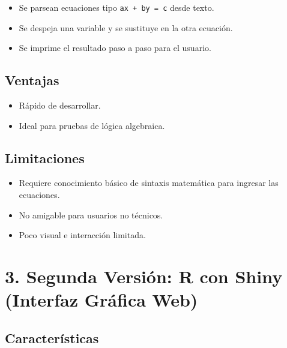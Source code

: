 \documentclass[a4paper,10pt]{article}
\begin{document}
\begin{itemize}
    \item Se parsean ecuaciones tipo \texttt{ax + by = c} desde texto.
    \item Se despeja una variable y se sustituye en la otra ecuación.
    \item Se imprime el resultado paso a paso para el usuario.
\end{itemize}

\subsection*{Ventajas}
\begin{itemize}
    \item Rápido de desarrollar.
    \item Ideal para pruebas de lógica algebraica.
\end{itemize}

\subsection*{Limitaciones}
\begin{itemize}
    \item Requiere conocimiento básico de sintaxis matemática para ingresar las ecuaciones.
    \item No amigable para usuarios no técnicos.
    \item Poco visual e interacción limitada.
\end{itemize}

\section*{3. Segunda Versión: R con Shiny (Interfaz Gráfica Web)}

\subsection*{Características}
\end{document}

